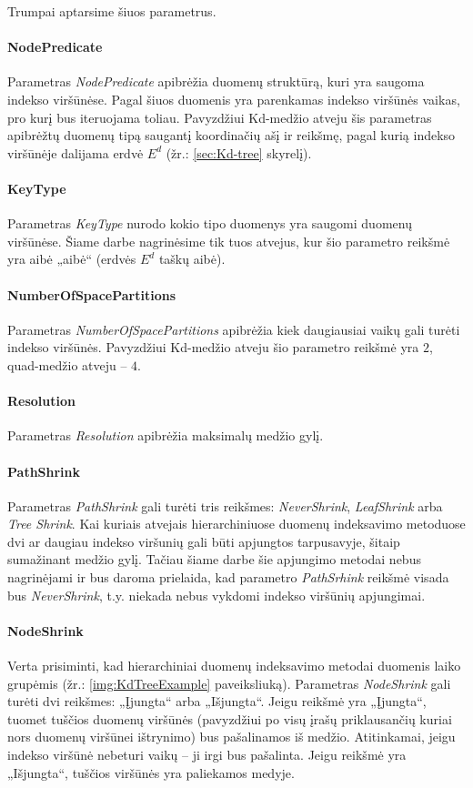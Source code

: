 Trumpai aptarsime šiuos parametrus.

\paragraph{NodePredicate}
Parametras {\it NodePredicate} apibrėžia duomenų struktūrą, kuri yra saugoma indekso viršūnėse.
Pagal šiuos duomenis yra parenkamas indekso viršūnės vaikas, pro kurį bus iteruojama toliau.
Pavyzdžiui Kd-medžio atveju šis parametras apibrėžtų duomenų tipą saugantį koordinačių ašį ir reikšmę, pagal kurią indekso viršūnėje dalijama erdvė $E^d$ (žr.: \ref{sec:Kd-tree} skyrelį).

\paragraph{KeyType}
Parametras {\it KeyType} nurodo kokio tipo duomenys yra saugomi duomenų viršūnėse.
Šiame darbe nagrinėsime tik tuos atvejus, kur šio parametro reikšmė yra aibė „aibė“ (erdvės $E^d$ taškų aibė).

\paragraph{NumberOfSpacePartitions}
Parametras {\it NumberOfSpacePartitions} apibrėžia kiek daugiausiai vaikų gali turėti indekso viršūnės.
Pavyzdžiui Kd-medžio atveju šio parametro reikšmė yra $2$, quad-medžio atveju -- $4$.

\paragraph{Resolution}
Parametras {\it Resolution} apibrėžia maksimalų medžio gylį.

\paragraph{PathShrink}
Parametras {\it PathShrink} gali turėti tris reikšmes: {\it NeverShrink}, {\it LeafShrink} arba {\it Tree Shrink}.
Kai kuriais atvejais hierarchiniuose duomenų indeksavimo metoduose dvi ar daugiau indekso viršunių gali būti apjungtos tarpusavyje, šitaip sumažinant medžio gylį.
Tačiau šiame darbe šie apjungimo metodai nebus nagrinėjami ir bus daroma prielaida, kad parametro {\it PathSrhink} reikšmė visada bus {\it NeverShrink}, t.y. niekada nebus vykdomi indekso viršūnių apjungimai.

\paragraph{NodeShrink}
Verta prisiminti, kad hierarchiniai duomenų indeksavimo metodai duomenis laiko grupėmis (žr.: \ref{img:KdTreeExample} paveiksliuką).
Parametras {\it NodeShrink} gali turėti dvi reikšmes: „Įjungta“ arba „Išjungta“.
Jeigu reikšmė yra „Įjungta“, tuomet tuščios duomenų viršūnės (pavyzdžiui po visų įrašų priklausančių kuriai nors duomenų viršūnei ištrynimo) bus pašalinamos iš medžio.
Atitinkamai, jeigu indekso viršūnė nebeturi vaikų -- ji irgi bus pašalinta.
Jeigu reikšmė yra „Išjungta“, tuščios viršūnės yra paliekamos medyje.


